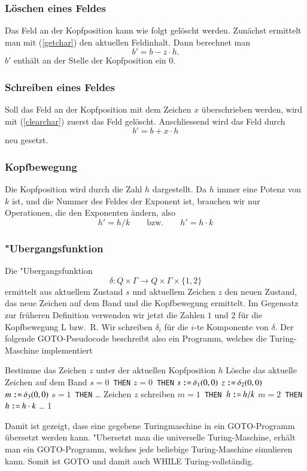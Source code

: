 \subsubsection{Löschen eines Feldes}
Das Feld an der Kopfposition kann wie folgt gelöscht werden.
Zunächst ermittelt man mit (\ref{getchar}) den aktuellen Feldinhalt.
Dann berechnet man
\begin{equation}
b' = b - z\cdot h.
\label{clearchar}
\end{equation}
$b'$ enthält an der Stelle der Kopfposition ein $0$.

\subsubsection{Schreiben eines Feldes}
Soll das Feld an der Kopfposition mit dem Zeichen $x$ überschrieben
werden, wird mit (\ref{clearchar}) zuerst das Feld gelöscht.
Anschliessend wird das Feld durch
\[
b'=b+x\cdot h
\]
neu gesetzt.

\subsubsection{Kopfbewegung}
Die Kopfposition wird durch die Zahl $h$ dargestellt.
Da $h$ immer eine Potenz von $k$ ist, und die Nummer des Feldes der
Exponent ist, brauchen wir nur Operationen, die den Exponenten
ändern, also
\[
h'=h/k\qquad\text{bzw.}\qquad h'=h\cdot k
\]

\subsubsection{"Ubergangsfunktion}
Die "Ubergangsfunktion
\[
\delta\colon Q\times \Gamma\to Q\times \Gamma\times\{1, 2\}
\]
ermittelt aus aktuellem Zustand $s$ und
aktuellem Zeichen $z$ den neuen Zustand, das neue Zeichen auf
dem Band und die Kopfbewegung ermittelt. Im Gegensatz zur früheren
Definition verwenden wir jetzt die Zahlen $1$ und $2$ für die
Kopfbewegung L bzw.~R.
Wir schreiben $\delta_i$ für die $i$-te Komponente von $\delta$.
Der folgende GOTO-Pseudocode
beschreibt also ein Programm, welches die Turing-Maschine implementiert
\begin{algorithmic}[1]
\STATE Bestimme das Zeichen $z$ unter der aktuellen Kopfposition $h$
\STATE Lösche das aktuelle Zeichen auf dem Band
$s=0${\tt\ THEN}
$z=0${\tt\ THEN}
\STATE {\tt \ \ \ \ \ \ \ \ }$s\mathbin{\texttt{:=}}\delta_1(0,0)$
\STATE {\tt \ \ \ \ \ \ \ \ }$z\mathbin{\texttt{:=}}\delta_2(0,0)$
\STATE {\tt \ \ \ \ \ \ \ \ }$m\mathbin{\texttt{:=}}\delta_3(0,0)$
$s=1${\tt\ THEN}
\STATE {\tt \ \ \ \ }\dots
{}
\STATE Zeichen $z$ schreiben
$m=1${\tt\ THEN }$h\mathbin{\texttt{:=}} h/k$
$m=2${\tt\ THEN }$h\mathbin{\texttt{:=}} h\cdot k$
\STATE \dots
{}1
\end{algorithmic}
Damit ist gezeigt, dass eine gegebene Turingmaschine in ein
GOTO-Programm übersetzt werden kann. "Ubersetzt man die universelle
Turing-Maschine, erhält man ein GOTO-Programm, welches jede beliebige
Turing-Maschine simulieren kann. Somit ist GOTO und damit auch WHILE
Turing-vollständig.


